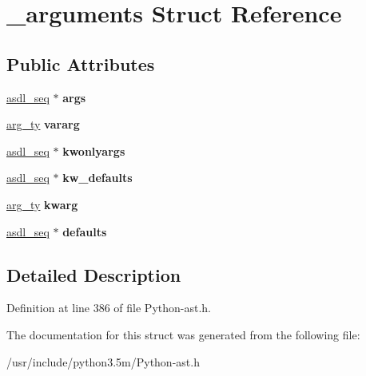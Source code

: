 \hypertarget{struct__arguments}{}\section{\+\_\+arguments Struct Reference}
\label{struct__arguments}
\subsection*{Public Attributes}
\begin{DoxyCompactItemize}
\item 
\hyperlink{structasdl__seq}{asdl\+\_\+seq} $\ast$ {\bfseries args}\hypertarget{struct__arguments_a8c7f1276ee2548bfb5f83e1226a81120}{}\label{struct__arguments_a8c7f1276ee2548bfb5f83e1226a81120}

\item 
\hyperlink{struct__arg}{arg\+\_\+ty} {\bfseries vararg}\hypertarget{struct__arguments_a7a4c5d2913274994c51dce9db2dfed10}{}\label{struct__arguments_a7a4c5d2913274994c51dce9db2dfed10}

\item 
\hyperlink{structasdl__seq}{asdl\+\_\+seq} $\ast$ {\bfseries kwonlyargs}\hypertarget{struct__arguments_ab9566ca54cd6ce53756a73c474b992af}{}\label{struct__arguments_ab9566ca54cd6ce53756a73c474b992af}

\item 
\hyperlink{structasdl__seq}{asdl\+\_\+seq} $\ast$ {\bfseries kw\+\_\+defaults}\hypertarget{struct__arguments_add609b561677ff6cab47e44065fbc2cc}{}\label{struct__arguments_add609b561677ff6cab47e44065fbc2cc}

\item 
\hyperlink{struct__arg}{arg\+\_\+ty} {\bfseries kwarg}\hypertarget{struct__arguments_a295c30a7bc0592ec44c6e5fa763560b5}{}\label{struct__arguments_a295c30a7bc0592ec44c6e5fa763560b5}

\item 
\hyperlink{structasdl__seq}{asdl\+\_\+seq} $\ast$ {\bfseries defaults}\hypertarget{struct__arguments_a23d24a2fa218bdb0a430df6353d19b63}{}\label{struct__arguments_a23d24a2fa218bdb0a430df6353d19b63}

\end{DoxyCompactItemize}


\subsection{Detailed Description}


Definition at line 386 of file Python-\/ast.\+h.



The documentation for this struct was generated from the following file\+:\begin{DoxyCompactItemize}
\item 
/usr/include/python3.\+5m/Python-\/ast.\+h\end{DoxyCompactItemize}

